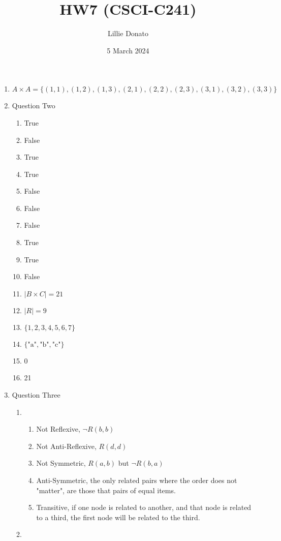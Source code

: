 \documentclass{article}
\title{HW7 (CSCI-C241)}
\author{Lillie Donato}
\date{5 March 2024}
\begin{document}
\maketitle

\begin{enumerate}
    \item $A \times A = \{(1,1),(1,2),(1,3),(2,1),(2,2),(2,3),(3,1),(3,2),(3,3)\}$
    \item Question Two
    \begin{enumerate}
        \item True
        \item False
        \item True
        \item True
        \item False
        \item False
        \item False
        \item True
        \item True
        \item False
        \item $|B \times C| = 21$
        \item $|R| = 9$
        \item $\{1,2,3,4,5,6,7\}$
        \item $\{\text{"a"}, \text{"b"}, \text{"c"}\}$
        \item 0
        \item 21
    \end{enumerate}
    \item Question Three
    \begin{enumerate}
        \item
        \begin{enumerate}
            \item Not Reflexive, $\neg R(b, b)$
            \item Not Anti-Reflexive, $R(d, d)$
            \item Not Symmetric, $R(a, b)$ but $\neg R(b, a)$
            \item Anti-Symmetric, the only related pairs where the order does not "matter", are those that pairs of equal items.
            \item Transitive, if one node is related to another, and that node is related to a third, the first node will be related to the third.
        \end{enumerate}
        \item
        \begin{enumerate}

\end{enumerate}
\end{enumerate}
\end{enumerate}
\end{document}
